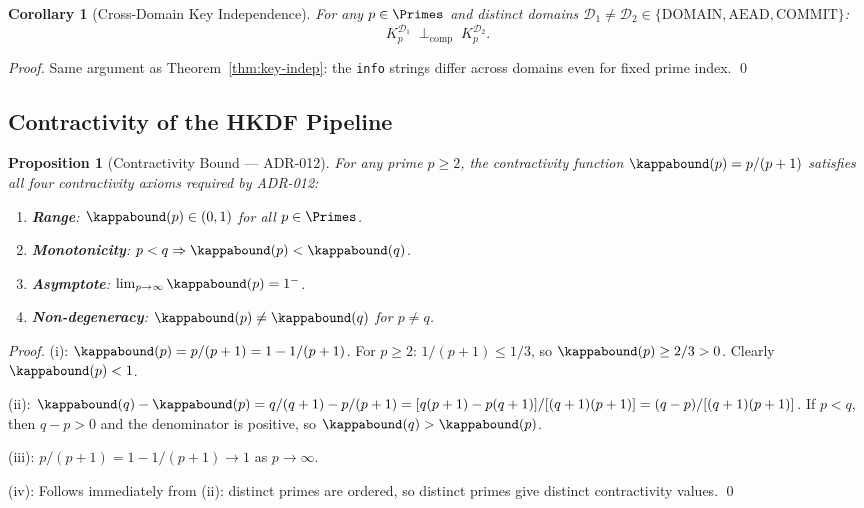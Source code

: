 \documentclass[11pt,letterpaper]{article}
\newtheorem{proposition}[theorem]{Proposition}
\newtheorem{corollary}[theorem]{Corollary}
\theoremstyle{remark}
\begin{document}
\begin{corollary}[Cross-Domain Key Independence]
For any $p \in \Primes$ and distinct domains
$\mathcal{D}_1 \neq \mathcal{D}_2 \in \{\text{DOMAIN}, \text{AEAD}, \text{COMMIT}\}$:
\[
  K_p^{\mathcal{D}_1} \;\perp_{\text{comp}}\; K_p^{\mathcal{D}_2}. \tag{A23}
\]
\end{corollary}

\begin{proof}
Same argument as Theorem~\ref{thm:key-indep}: the \texttt{info} strings
differ across domains even for fixed prime index. \qed
\end{proof}

\subsection{Contractivity of the HKDF Pipeline}

\begin{proposition}[Contractivity Bound — ADR-012]
\label{prop:contractivity-adr012}
For any prime $p \geq 2$, the contractivity function $\kappabound(p) = p/(p+1)$
satisfies all four contractivity axioms required by ADR-012:
\begin{enumerate}[leftmargin=1.5em, label=(\roman*)]
  \item \textbf{Range}: $\kappabound(p) \in (0,1)$ for all $p \in \Primes$.
  \item \textbf{Monotonicity}: $p < q \Rightarrow \kappabound(p) < \kappabound(q)$.
  \item \textbf{Asymptote}: $\lim_{p \to \infty} \kappabound(p) = 1^{-}$.
  \item \textbf{Non-degeneracy}: $\kappabound(p) \neq \kappabound(q)$
        for $p \neq q$.
\end{enumerate}
\end{proposition}

\begin{proof}
(i): $\kappabound(p) = p/(p+1) = 1 - 1/(p+1)$.
For $p \geq 2$: $1/(p+1) \leq 1/3$, so $\kappabound(p) \geq 2/3 > 0$.
Clearly $\kappabound(p) < 1$.

(ii): $\kappabound(q) - \kappabound(p) = q/(q+1) - p/(p+1)
= [q(p+1) - p(q+1)] / [(q+1)(p+1)] = (q - p) / [(q+1)(p+1)]$.
If $p < q$, then $q - p > 0$ and the denominator is positive, so
$\kappabound(q) > \kappabound(p)$.

(iii): $p/(p+1) = 1 - 1/(p+1) \to 1$ as $p \to \infty$.

(iv): Follows immediately from (ii): distinct primes are ordered, so
distinct primes give distinct contractivity values. \qed
\end{proof}
\end{document}
